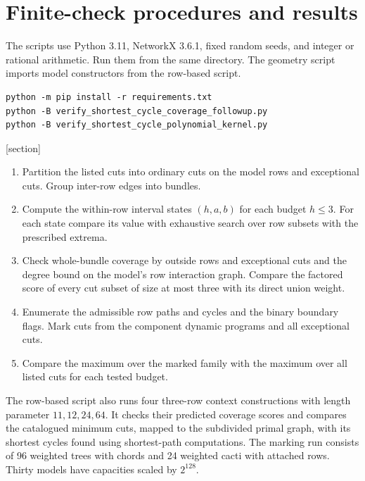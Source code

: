 \documentclass[10pt,letterpaper]{article}
\begin{document}
\clearpage
\appendix
\section{Finite-check procedures and results}\label{app:checks}
The scripts use Python 3.11, NetworkX 3.6.1, fixed random seeds, and integer or rational arithmetic. Run them from the same directory. The geometry script imports model constructors from the row-based script.
\begin{verbatim}
python -m pip install -r requirements.txt
python -B verify_shortest_cycle_coverage_followup.py
python -B verify_shortest_cycle_polynomial_kernel.py
\end{verbatim}

[section]

\begin{algorithm}[H]
\caption{Row-based coverage and marking check on a known cut family}
\label{alg:row}
\begin{enumerate}
\item Partition the listed cuts into ordinary cuts on the model rows and exceptional cuts. Group inter-row edges into bundles.
\item Compute the within-row interval states \((h,a,b)\) for each budget \(h\le3\). For each state compare its value with exhaustive search over row subsets with the prescribed extrema.
\item Check whole-bundle coverage by outside rows and exceptional cuts and the degree bound on the model's row interaction graph. Compare the factored score of every cut subset of size at most three with its direct union weight.
\item Enumerate the admissible row paths and cycles and the binary boundary flags. Mark cuts from the component dynamic programs and all exceptional cuts.
\item Compare the maximum over the marked family with the maximum over all listed cuts for each tested budget.
\end{enumerate}
\end{algorithm}

The row-based script also runs four three-row context constructions with length parameter \(11,12,24,64\). It checks their predicted coverage scores and compares the catalogued minimum cuts, mapped to the subdivided primal graph, with its shortest cycles found using shortest-path computations. The marking run consists of 96 weighted trees with chords and 24 weighted cacti with attached rows. Thirty models have capacities scaled by \(2^{128}\).
\end{document}
